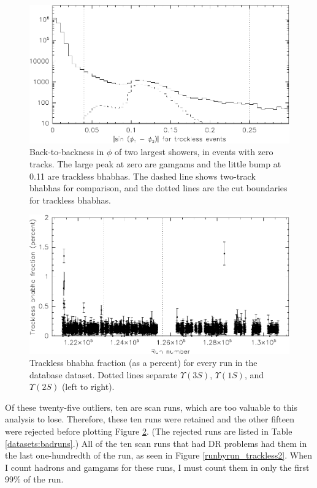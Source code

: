 \begin{figure}[p]
  \includegraphics[width=\linewidth]{plots/runbyrun_trackless0}
  \caption{\label{runbyrun_trackless0} Back-to-backness in $\phi$ of
    two largest showers, in events with zero tracks.  The large peak at
    zero are gamgams and the little bump at 0.11 are trackless bhabhas.
    The dashed line shows two-track bhabhas for comparison, and the
    dotted lines are the cut boundaries for trackless bhabhas.}
\end{figure}

\begin{figure}[p]
  \includegraphics[width=\linewidth]{plots/runbyrun_trackless}
  \caption{\label{runbyrun_trackless} Trackless bhabha fraction (as a
  percent) for every run in the database dataset.  Dotted lines
  separate $\Upsilon(3S)$, $\Upsilon(1S)$, and $\Upsilon(2S)$ (left to
  right).}
\end{figure}

Of these twenty-five outliers, ten are scan runs, which are too
valuable to this analysis to lose.  Therefore, these ten runs were
retained and the other fifteen were rejected before plotting Figure
\ref{runbyrun_trackless}.  (The rejected runs are listed in Table
\ref{datasets:badruns}.)  All of the ten scan runs that had DR
problems had them in the last one-hundredth of the run, as seen in
Figure \ref{runbyrun_trackless2}.  When I count hadrons and gamgams
for these runs, I must count them in only the first 99\% of the run.

